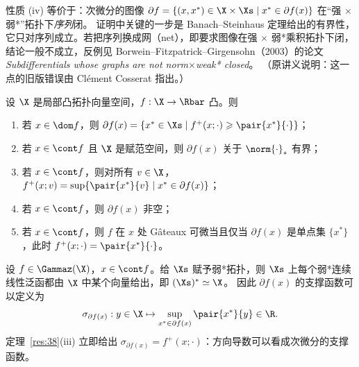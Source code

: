 \begin{remark}
\label{rem:15}
性质 (iv) 等价于：次微分的图像 $\partial f=\{(x,x^*)\in\X\times\Xs\mid x^*\in\partial f(x)\}$ 在“强 $\times$ 弱*”拓扑下\emph{序列}闭。
证明中关键的一步是 Banach--Steinhaus 定理给出的有界性，它只对序列成立。若把序列换成网（net），即要求图像在强 $\times$ 弱*乘积拓扑下闭，
结论一般不成立，反例见 Borwein--Fitzpatrick--Girgensohn（2003）的论文
\emph{Subdifferentials whose graphs are not norm$\times$weak* closed}。
（原讲义说明：这一点的旧版错误由 Clément Cosserat 指出。）
\end{remark}

\begin{theorem}[凸函数的次微分]
\label{res:38}
设 $\X$ 是局部凸拓扑向量空间，$f:\X\to\Rbar$ 凸。则
\begin{enumerate}[label=(\roman*)]
  \item 若 $x\in\dom f$，则 $\partial f(x)=\{x^*\in\Xs\mid f^+(x;\cdot)\geqslant\pair{x^*}{\cdot}\}$；
  \item 若 $x\in\cont f$ 且 $\X$ 是赋范空间，则 $\partial f(x)$ 关于 $\norm{\cdot}_*$ 有界；
  \item 若 $x\in\cont f$，则对所有 $v\in\X$，$f^+(x;v)=\sup\{\pair{x^*}{v}\mid x^*\in\partial f(x)\}$；
  \item 若 $x\in\cont f$，则 $\partial f(x)$ 非空；
  \item 若 $x\in\cont f$，则 $f$ 在 $x$ 处 Gâteaux 可微当且仅当 $\partial f(x)$ 是单点集 $\{x^*\}$，此时 $f^+(x;\cdot)=\pair{x^*}{\cdot}$。
\end{enumerate}
\end{theorem}

\begin{remark}[次微分的支撑函数]
\label{rem:16}
设 $f\in\Gammaz(\X)$，$x\in\cont f$。给 $\Xs$ 赋予弱*拓扑，则 $\Xs$ 上每个弱*连续线性泛函都由 $\X$ 中某个向量给出，即 $(\Xs)^*\simeq\X$。
因此 $\partial f(x)$ 的支撑函数可以定义为
\[
  \sigma_{\partial f(x)}:y\in\X\mapsto\sup_{x^*\in\partial f(x)}\pair{x^*}{y}\in\R .
\]
定理~\ref{res:38}(iii) 立即给出 $\sigma_{\partial f(x)}=f^+(x;\cdot)$：方向导数可以看成次微分的支撑函数。
\end{remark}


